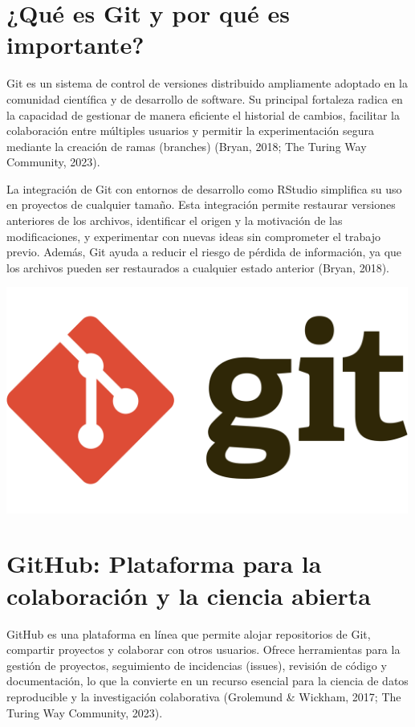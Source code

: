\documentclass[
  spanish,
  a4paper,
  DIV=11,
  numbers=noendperiod,
  onepage,
  openany]{scrreprt}
\begin{document}
\section{¿Qué es Git y por qué es
importante?}\label{quuxe9-es-git-y-por-quuxe9-es-importante}

Git es un sistema de control de versiones distribuido ampliamente
adoptado en la comunidad científica y de desarrollo de software. Su
principal fortaleza radica en la capacidad de gestionar de manera
eficiente el historial de cambios, facilitar la colaboración entre
múltiples usuarios y permitir la experimentación segura mediante la
creación de ramas (branches) (Bryan, 2018; The Turing Way Community,
2023).

La integración de Git con entornos de desarrollo como RStudio simplifica
su uso en proyectos de cualquier tamaño. Esta integración permite
restaurar versiones anteriores de los archivos, identificar el origen y
la motivación de las modificaciones, y experimentar con nuevas ideas sin
comprometer el trabajo previo. Además, Git ayuda a reducir el riesgo de
pérdida de información, ya que los archivos pueden ser restaurados a
cualquier estado anterior (Bryan, 2018).

\begin{center}
\includegraphics[width=5.20833in,height=\textheight,keepaspectratio]{Git-logo.png}
\end{center}

\section{GitHub: Plataforma para la colaboración y la ciencia
abierta}\label{github-plataforma-para-la-colaboraciuxf3n-y-la-ciencia-abierta}

GitHub es una plataforma en línea que permite alojar repositorios de
Git, compartir proyectos y colaborar con otros usuarios. Ofrece
herramientas para la gestión de proyectos, seguimiento de incidencias
(issues), revisión de código y documentación, lo que la convierte en un
recurso esencial para la ciencia de datos reproducible y la
investigación colaborativa (Grolemund \& Wickham, 2017; The Turing Way
Community, 2023).
\end{document}
